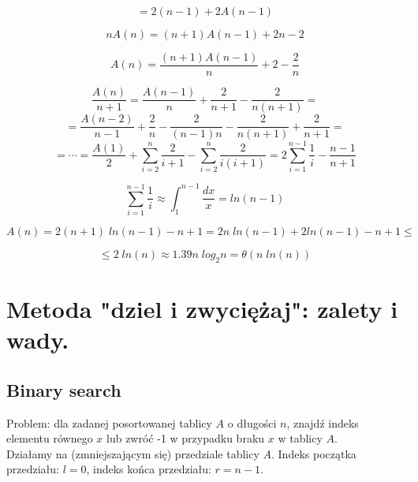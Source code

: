 \documentclass[12pt]{article}
\begin{document}
        $$= 2(n - 1) + 2A(n - 1)$$
        
        $$nA(n) = (n + 1)A(n - 1) + 2n - 2$$
        
        $$A(n) = \frac{(n + 1)A(n - 1)}{n} + 2 - \frac{2}{n}$$
        
        $$\frac{A(n)}{n + 1} = \frac{A(n - 1)}{n} + \frac{2}{n + 1} - \frac{2}{n(n + 1)} = $$
         $$= \frac{A(n - 2)}{n - 1} + \frac{2}{n} - \frac{2}{(n - 1)n} - \frac{2}{n(n + 1)} + \frac{2}{n + 1} = $$
         $$ = \cdots = \frac{A(1)}{2} + \sum_{i = 2}^n \frac{2}{i + 1} - \sum_{i = 2}^n \frac{2}{i(i + 1)} = 
         2\sum_{i = 1}^{n - 1} \frac{1}{i} - \frac{n - 1}{n + 1}$$
         
         $$\sum_{i = 1}^{n - 1} \frac{1}{i} \approx \int_1^{n - 1}\frac{dx}{x} = ln(n - 1)$$
         
         $$A(n) = 2(n + 1)\;ln(n - 1) - n + 1 = 2n\;ln(n - 1) + 2ln(n - 1) - n + 1 \leq$$
         
         $$\leq 2\;ln(n) \approx 1.39 n \; log_2 n = \theta(n\;ln(n))$$
        
    \newpage


    \section{Metoda "dziel i zwyciężaj": zalety i wady.}
    
        \subsection{Binary search}

        Problem: dla zadanej posortowanej tablicy $A$ o długości $n$, znajdź indeks elementu
        równego $x$ lub zwróć -1 w przypadku braku $x$ w tablicy $A$.
        \[\]
        Działamy na (zmniejszającym się) przedziale tablicy $A$. Indeks początka przedziału: 
        $l = 0$, indeks końca przedziału: $r = n - 1$.
\end{document}

